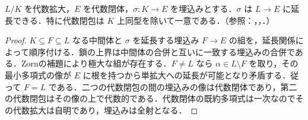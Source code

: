 \begin{prop}[代数閉包への埋込みの延長]
$L/K$ を代数拡大，$E$ を代数閉体，$\sigma:K\to E$ を埋込みとする．$\sigma$ は $L\to E$ に延長できる．特に代数閉包は $K$ 上同型を除いて一意である．（参照：，，．）
\end{prop}
\begin{proof}
$K\subseteq F\subseteq L$ なる中間体と $\sigma$ を延長する埋込み $F\to E$ の組を，延長関係によって順序付ける．鎖の上界は中間体の合併と互いに一致する埋込みの合併である．Zornの補題により極大な組が存在する．$F\ne L$ なら $\alpha\in L\setminus F$ を取り，その最小多項式の像が $E$ に根を持つから単拡大への延長が可能となり矛盾する．従って $F=L$ である．二つの代数閉包の間の埋込みの像は代数閉体であり，第二の代数閉包はその像の上で代数的である．代数閉体の既約多項式は一次なのでその代数拡大は自明であり，埋込みは全射となる．
\end{proof}
